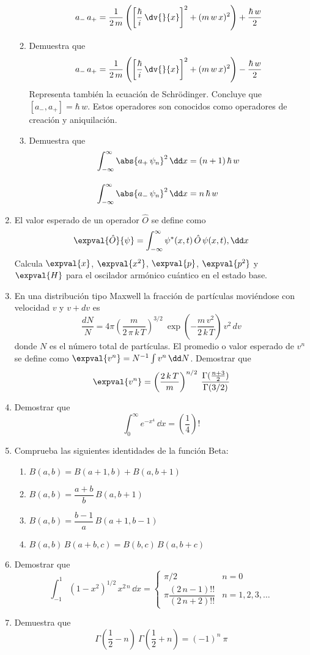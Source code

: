 \begin{enumerate}
\begin{enumerate}[label=\roman*)]
\[ a_{-} \, a_{+} = \dfrac{1}{2 \, m} \left( \left[ \dfrac{\hbar}{i} \, \dv{}{x} \right]^{2} + (m \, w \, x)^{2} \right) + \dfrac{\hbar \, w}{2} \]
\item Demuestra que
\[ a_{-} \, a_{+} = \dfrac{1}{2 \, m} \left( \left[ \dfrac{\hbar}{i} \, \dv{}{x} \right]^{2} + (m \, w \, x)^{2} \right) - \dfrac{\hbar \, w}{2} \]
Representa también la ecuación de Schrödinger. Concluye que $[a_{-}, a_{+}] = \hbar \, w$. Estos operadores son conocidos como operadores de creación y aniquilación.
\item Demuestra que
\begin{align*}
\int_{-\infty}^{\infty} \abs{a_{+} \, \psi_{n}}^{2} \, \dd x &= (n+1) \, \hbar \, w \\[1em]
\int_{-\infty}^{\infty} \abs{a_{-} \, \psi_{n}}^{2} \, \dd x &= n \, \hbar \, w
\end{align*}
\end{enumerate}
\item El valor esperado de un operador $\hat{O}$ se define como
\[ \expval{\hat{O}}{\psi} = \int_{-\infty}^{\infty} \psi^{*} (x, t) \, \hat{O} \, \psi (x, t) , \dd x  \]
Calcula $\expval{x}$, $\expval{x^{2}}$, $\expval{p}$, $\expval{p^{2}}$ y $\expval{H}$ para el oscilador armónico cuántico en el estado base.
\item En una distribución tipo Maxwell la fracción de partículas moviéndose con velocidad $v$ y $v+dv$ es
\[ \dfrac{dN}{N} = 4 \pi \left( \dfrac{m}{2 \, \pi \, k \, T} \right)^{3/2} \: \exp \left( - \dfrac{m \, v^{2}}{2 \, k \, T} \right) \, v^{2} \, dv \]
donde $N$ es el número total de partículas. El promedio o valor esperado de $v^{n}$ se define como $\expval{v^{n}} = N^{-1} \int v^{n} \, \dd N$. Demostrar que
\[ \expval{v^{n}} = \left( \dfrac{2 \, k \, T}{m} \right)^{n/2} \: \dfrac{\Gamma (\frac{n +3}{2})}{\Gamma (3/2)}\]
\item Demostrar que
\[ \int_{0}^{\infty} e^{-x^{4}} \, \dd x = \left( \dfrac{1}{4} \right) !\]
\item Comprueba las siguientes identidades de la función Beta:
\begin{enumerate}[label=\roman*)]
\setlength\itemsep{1em}
\item $B(a, b) = B(a+1, b) + B(a, b+1)$
\item $B(a, b) = \dfrac{a+b}{b} \, B(a, b+1)$ 
\item $B(a, b) = \dfrac{b-1}{a} \, B(a+1, b-1)$
\item $B(a, b) \, B(a+b, c) = B(b, c) \, B(a, b+c)$
\end{enumerate}
\item Demostrar que
\[ \int_{-1}^{1} (1-x^{2})^{1/2} \, x^{2 \, n} \, \dd x =  
\begin{cases}
\pi/2 & n = 0 \\[1em]
\pi \dfrac{(2 \, n-1)!!}{(2 \, n+2)!!} & n=1,2,3,\ldots  \end{cases}
 \]
\item Demuestra que 
\[ \Gamma(\frac{1}{2} - n) \: \Gamma(\frac{1}{2} + n) = (-1)^{n} \: \pi \]
\end{enumerate}
\vfill


